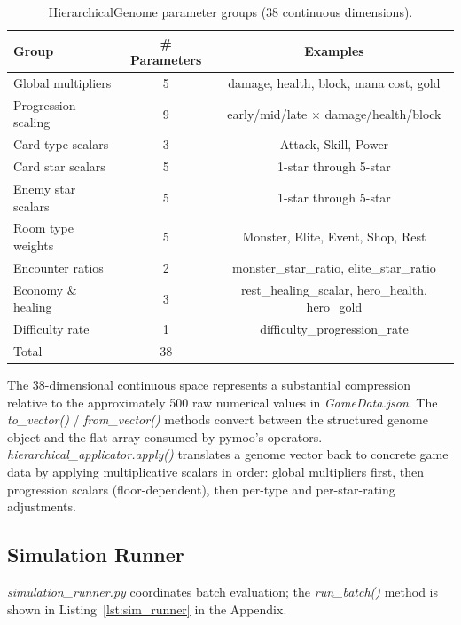 \begin{table}[htbp]
    \centering
    \caption{HierarchicalGenome parameter groups (38 continuous dimensions).}
    \label{tab:genome_params}
    \begin{tabular}{lcc}
        \toprule
        Group & \# Parameters & Examples \\
        \midrule
        Global multipliers       & 5  & damage, health, block, mana cost, gold \\
        Progression scaling      & 9  & early/mid/late $\times$ damage/health/block \\
        Card type scalars        & 3  & Attack, Skill, Power \\
        Card star scalars        & 5  & 1-star through 5-star \\
        Enemy star scalars       & 5  & 1-star through 5-star \\
        Room type weights        & 5  & Monster, Elite, Event, Shop, Rest \\
        Encounter ratios         & 2  & monster\_star\_ratio, elite\_star\_ratio \\
        Economy \& healing       & 3  & rest\_healing\_scalar, hero\_health, hero\_gold \\
        Difficulty rate          & 1  & difficulty\_progression\_rate \\
        \midrule
        Total & 38 & \\
        \bottomrule
    \end{tabular}
\end{table}

The 38-dimensional continuous space represents a substantial compression relative to the approximately 500 raw numerical values in \textit{GameData.json}. The \textit{to\_vector()} / \textit{from\_vector()} methods convert between the structured genome object and the flat array consumed by pymoo's operators. \textit{hierarchical\_applicator.apply()} translates a genome vector back to concrete game data by applying multiplicative scalars in order: global multipliers first, then progression scalars (floor-dependent), then per-type and per-star-rating adjustments.

\subsection{Simulation Runner}

\textit{simulation\_runner.py} coordinates batch evaluation; the \textit{run\_batch()} method is shown in Listing~\ref{lst:sim_runner} in the Appendix.

